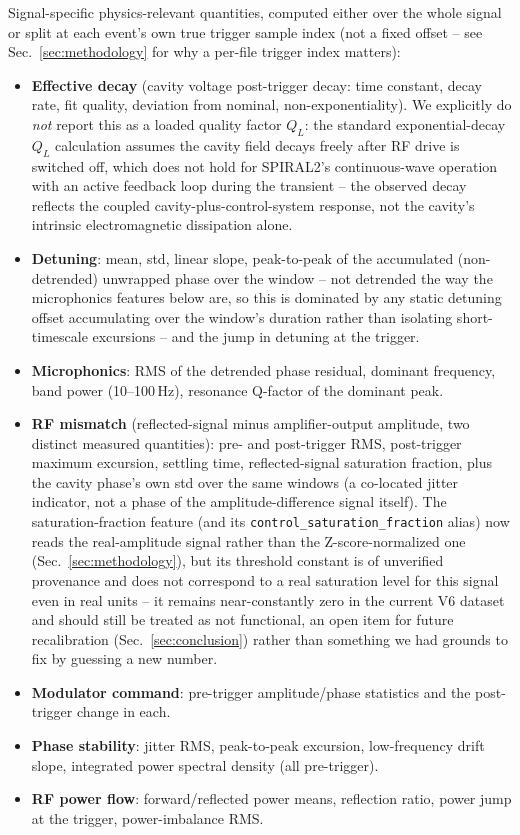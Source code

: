 Signal-specific physics-relevant quantities, computed either over the whole signal or split at each event's own true trigger sample index (not a fixed offset -- see Sec.~\ref{sec:methodology} for why a per-file trigger index matters):

\begin{itemize}
    \item \textbf{Effective decay} (cavity voltage post-trigger decay: time constant, decay rate, fit quality, deviation from nominal, non-exponentiality). We explicitly do \emph{not} report this as a loaded quality factor $Q_L$: the standard exponential-decay $Q_L$ calculation assumes the cavity field decays freely after RF drive is switched off, which does not hold for SPIRAL2's continuous-wave operation with an active feedback loop during the transient -- the observed decay reflects the coupled cavity-plus-control-system response, not the cavity's intrinsic electromagnetic dissipation alone.
    \item \textbf{Detuning}: mean, std, linear slope, peak-to-peak of the accumulated (non-detrended) unwrapped phase over the window -- not detrended the way the microphonics features below are, so this is dominated by any static detuning offset accumulating over the window's duration rather than isolating short-timescale excursions -- and the jump in detuning at the trigger.
    \item \textbf{Microphonics}: RMS of the detrended phase residual, dominant frequency, band power (10--100\,Hz), resonance Q-factor of the dominant peak.  %
    \item \textbf{RF mismatch} (reflected-signal minus amplifier-output amplitude, two distinct measured quantities): pre- and post-trigger RMS, post-trigger maximum excursion, settling time, reflected-signal saturation fraction, plus the cavity phase's own std over the same windows (a co-located jitter indicator, not a phase of the amplitude-difference signal itself). The saturation-fraction feature (and its \texttt{control\_saturation\_fraction} alias) now reads the real-amplitude signal rather than the Z-score-normalized one (Sec.~\ref{sec:methodology}), but its threshold constant is of unverified provenance and does not correspond to a real saturation level for this signal even in real units -- it remains near-constantly zero in the current V6 dataset and should still be treated as not functional, an open item for future recalibration (Sec.~\ref{sec:conclusion}) rather than something we had grounds to fix by guessing a new number.
    \item \textbf{Modulator command}: pre-trigger amplitude/phase statistics and the post-trigger change in each.
    \item \textbf{Phase stability}: jitter RMS, peak-to-peak excursion, low-frequency drift slope, integrated power spectral density (all pre-trigger).
    \item \textbf{RF power flow}: forward/reflected power means, reflection ratio, power jump at the trigger, power-imbalance RMS.
\end{itemize}

